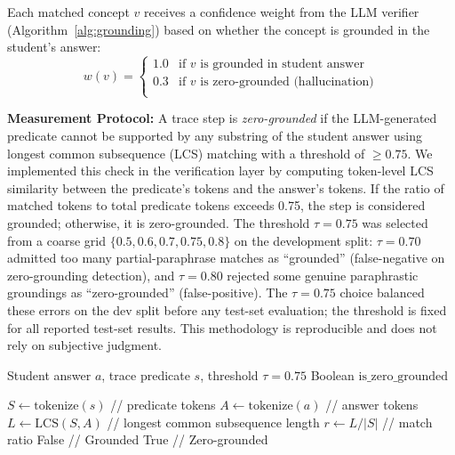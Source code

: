 \documentclass[conference]{IEEEtran}
\begin{document}
Each matched concept $v$ receives a confidence weight from the LLM verifier
(Algorithm~\ref{alg:grounding}) based on whether the concept is grounded in
the student's answer:
\begin{equation}
  w(v) =
  \begin{cases}
    1.0 & \text{if } v \text{ is grounded in student answer} \\
    0.3 & \text{if } v \text{ is zero-grounded (hallucination)} \\
  \end{cases}
  \label{eq:verifier_weight}
\end{equation}

\textbf{Measurement Protocol:} A trace step is \emph{zero-grounded} if the LLM-generated
predicate cannot be supported by any substring of the student answer using longest common
subsequence (LCS) matching with a threshold of $\geq 0.75$. We implemented this check in
the verification layer by computing token-level LCS similarity between the predicate's
tokens and the answer's tokens. If the ratio of matched tokens to total predicate tokens
exceeds 0.75, the step is considered grounded; otherwise, it is zero-grounded. The
threshold $\tau = 0.75$ was selected from a coarse grid $\{0.5, 0.6, 0.7, 0.75, 0.8\}$
on the development split: $\tau = 0.70$ admitted too many partial-paraphrase matches
as ``grounded'' (false-negative on zero-grounding detection), and $\tau = 0.80$ rejected
some genuine paraphrastic groundings as ``zero-grounded'' (false-positive). The
$\tau = 0.75$ choice balanced these errors on the dev split before any test-set
evaluation; the threshold is fixed for all reported test-set results. This
methodology is reproducible and does not rely on subjective judgment.

\begin{algorithm}[h]
\caption{Zero-Grounding Detection}
\label{alg:grounding}
\begin{algorithmic}
  \REQUIRE Student answer $a$, trace predicate $s$, threshold $\tau = 0.75$
  \ENSURE Boolean $\text{is\_zero\_grounded}$

  \STATE $S \gets \text{tokenize}(s)$ \quad // predicate tokens
  \STATE $A \gets \text{tokenize}(a)$ \quad // answer tokens
  \STATE $L \gets \text{LCS}(S, A)$ \quad // longest common subsequence length
  \STATE $r \gets L / |S|$ \quad // match ratio
    \RETURN False \quad // Grounded
  \ELSE
    \RETURN True \quad // Zero-grounded
  \ENDIF
\end{algorithmic}
\end{algorithm}
\end{document}
